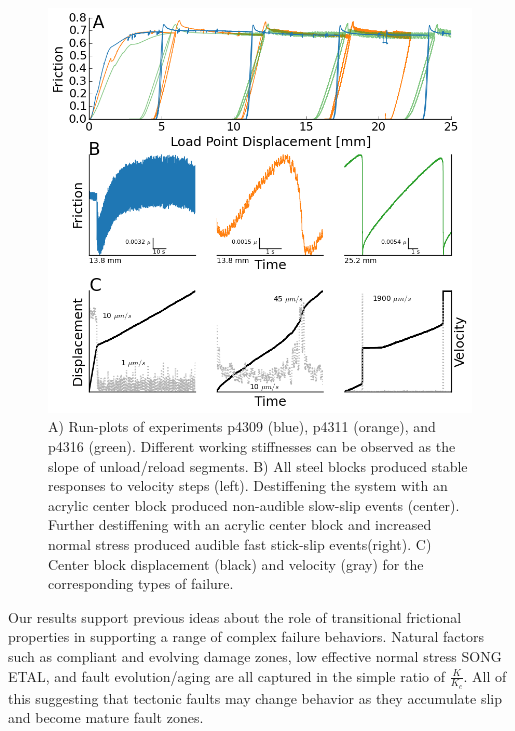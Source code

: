 \documentclass[11pt]{article}
\begin{document}
\begin{figure}
	\centering
		\includegraphics[scale=0.7]{../Figures/Fig_Runplot/runplot.png}
   	\caption{A) Run-plots of experiments p4309 (blue), p4311 (orange), and p4316
   	(green). Different working stiffnesses can be observed as the slope of
   	unload/reload segments. B) All steel blocks produced stable responses to
   	velocity steps (left). Destiffening the system with an acrylic center block
   	produced non-audible slow-slip events (center). Further destiffening with an
   	acrylic center block and increased normal stress produced audible fast
   	stick-slip events(right). C) Center block displacement (black) and velocity
   	(gray) for the corresponding types of failure.}
  	\label{Figure:Runplot}
\end{figure}

Our results support previous ideas about the role of transitional frictional
properties in supporting a range of complex failure behaviors. Natural factors
such as compliant and evolving damage zones, low effective normal stress
\cite{audet2009seismic,kitajima2012elevated,shelly2015complexity} SONG ETAL,
and fault evolution/aging \cite{ikari2011relation} are all captured in the
simple ratio of $\frac{K}{K_c}$.  All of this
suggesting that tectonic faults may change behavior as they accumulate slip and
become mature fault zones.
\end{document}
